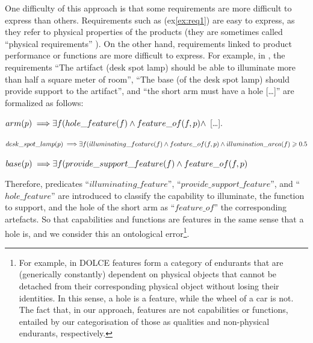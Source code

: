 \documentclass[sw]{iosart2x}
\newcommand{\bflist}{\begin{list}{}{\setlength{\topsep}{2mm}\setlength{\partopsep}{0mm}\setlength{\parsep}{0mm}\setlength{\leftmargin}{9mm}\setlength{\labelwidth}{8mm}}}
\newcommand{\eflist}{\end{list}}
\newcommand{\ExLabel}{\textrm{ex}}
\newcommand{\myex}[1]{\refstepcounter{cntex}\begin{small}{\bf \ExLabel\thecntex\label{ex:#1}}\end{small}}
\newcounter{cntex}
\newcommand{\refex}[1]{({\ExLabel}\ref{#1})}
\newcommand{\myfi}{\hspace{0.9mm} \Longrightarrow}
\newcommand{\DOLCE}{\textsc{DOLCE}\xspace} %
\newcommand{\qquotes}[1]{``#1''}
\begin{document}
{One difficulty of this approach is that some requirements are more difficult to express than others.
Requirements such as \refex{ex:req1} are easy to express, as they refer to physical properties of the products (they are sometimes called \qquotes{physical requirements} \cite{jinxinlinRequirementOntologyEngineering1996}).
On the other hand, requirements linked to product performance or functions are more difficult to express.
For example, in \cite{jinxinlinRequirementOntologyEngineering1996}, the requirements \qquotes{The artifact (desk spot lamp) should be able to illuminate more than half a square meter of room}, \qquotes{The base (of the desk spot lamp) should provide support to the artifact}, and \qquotes{the short arm must have a hole [\dots]} are formalized as follows: 
\bflist
  \item[\myex{req2}] $ arm(p) \myfi \exists f(hole\_feature(f) \land
 feature\_of(f, p) \land
  $ [\dots]. 
  \item[\myex{req3}] $ desk\_spot\_lamp(p) \myfi \exists f( illuminating\_feature(f) \land feature\_of(f, p) \land illumination\_area(f) \geq 0.5 $
  \item[\myex{req4}] $ base(p) \myfi \exists f (provide\_support\_feature(f) \land feature\_of(f, p) $ 
\eflist
Therefore, predicates \qquotes{$illuminating\_feature$}, \qquotes{$provide\_support\_feature$}, and \qquotes{$hole\_feature$} are introduced to classify the capability to illuminate, the function to support, and the hole of the short arm as \qquotes{$feature\_of$} the corresponding artefacts. 
So that capabilities and functions are features in the same sense that a hole is, and we consider this an ontological error\footnote{For example, in \DOLCE features form a category of endurants that are (generically constantly) dependent on physical objects that cannot be detached from their corresponding physical object without losing their identities. In this sense, a hole is a feature, while the wheel of a car is not. The fact that, in our approach, features are not capabilities or functions, entailed by our categorisation of those as qualities and non-physical endurants, respectively.}.

}
\end{document}
